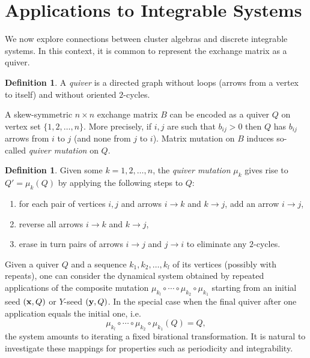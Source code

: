 \documentclass{amsart}
\theoremstyle{definition}
\newtheorem{definition}[theorem]{Definition}
\theoremstyle{remark}
\numberwithin{equation}{section}
\newcommand{\x}{{\bf x}}
\newcommand{\y}{{\bf y}}
\begin{document}
\section{Applications to Integrable Systems}\label{sec:integrable_systems}
	We now explore connections between cluster algebras and discrete integrable systems.  In this context, it is common to represent the exchange matrix as a quiver.

	\begin{definition}
		A \emph{quiver} is a directed graph without loops (arrows from a vertex to itself) and without oriented $2$-cycles.
	\end{definition}
	
	A skew-symmetric $n\times n$ exchange matrix $B$ can be encoded as a quiver $Q$ on vertex set $\{1,2,\ldots, n\}$.  More precisely, if $i,j$ are such that $b_{ij}>0$ then $Q$ has $b_{ij}$ arrows from $i$ to $j$ (and none from $j$ to $i$).  Matrix mutation on $B$ induces so-called \emph{quiver mutation} on $Q$.
	
	\begin{definition}
		Given some $k=1,2,\ldots, n$, the \emph{quiver mutation} $\mu_k$ gives rise to $Q' = \mu_k(Q)$ by applying the following steps to $Q$:
		\begin{enumerate}
		\item for each pair of vertices $i,j$ and arrows $i\to k$ and $k \to j$, add an arrow $i \to j$,
		\item reverse all arrows $i \to k$ and $k \to j$,
		\item erase in turn pairs of arrows $i \to j$ and $j \to i$ to eliminate any $2$-cycles.
		\end{enumerate}
	\end{definition}
	
	Given a quiver $Q$ and a sequence $k_1,k_2,\ldots, k_l$ of its vertices (possibly with repeats), one can consider the dynamical system obtained by repeated applications of the composite mutation $\mu_{k_l} \circ \cdots \circ \mu_{k_2} \circ \mu_{k_1}$ starting from an initial seed $(\x, Q)$ or $Y$-seed $(\y,Q)$.  In the special case when the final quiver after one application equals the initial one, i.e.
	\begin{displaymath}
		\mu_{k_l} \circ \cdots \circ \mu_{k_2} \circ \mu_{k_1}(Q) = Q,
	\end{displaymath}
	the system amounts to iterating a fixed birational transformation.  It is natural to investigate these mappings for properties such as periodicity and integrability.  
	
\end{document}
